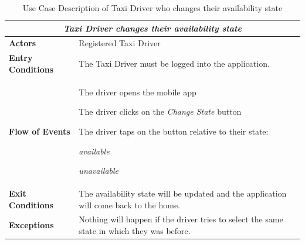 \documentclass[a4paper]{article}
\begin{document}
\begin{enumerate}[label=\bfseries G\arabic*:]
\begin{table} [H]
\begin{center}
\begin{tabular}{ |m{}|m{}|  }
\hline
    \multicolumn{2}{|c|}{\textbf{\textit{Taxi Driver changes their availability state}}} \\
\hline \hline
    \textbf{Actors}
&   Registered Taxi Driver
\\ \hline
    \textbf{Entry Conditions}
&   The Taxi Driver must be logged into the application.
\\ \hline
    \textbf{Flow of Events}
& 
    \begin{enumerate*}
    \item The driver opens the mobile app
    \item The driver clicks on the \emph{Change State} button
    \item The driver taps on the button relative to their state:
        \begin{itemize*}
        \item \emph{available}
        \item \emph{unavailable}
        \end{itemize*}
    \end{enumerate*}
\\ \hline
    \textbf{Exit Conditions}
&  The availability state will be updated and the application will come back to the home.
\\ \hline
    \textbf{Exceptions}
&   Nothing will happen if the driver tries to select the same state in which they was before.
\\ \hline
\end{tabular}
\end{center}
\caption{Use Case Description of Taxi Driver who changes their availability state}
\label{table:taxichangestate}
\end{table}


\end{enumerate}
\end{document}
